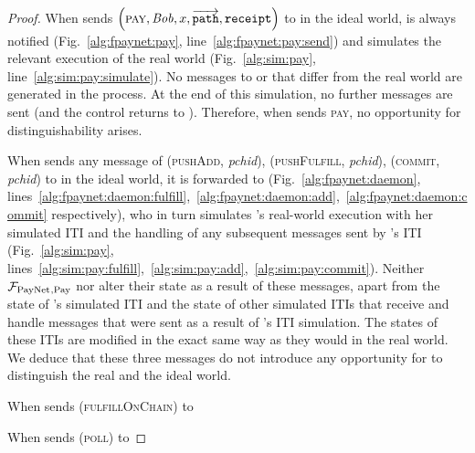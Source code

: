 \begin{proof}
  When \environment{} sends $\left(\textsc{pay}, \mathit{Bob}, x,
  \overrightarrow{\mathtt{path}}, \mathtt{receipt}\right)$ to \alice{} in the
  ideal world, \simulator{} is always notified (Fig.~\ref{alg:fpaynet:pay},
  line~\ref{alg:fpaynet:pay:send}) and simulates the relevant execution of the
  real world (Fig.~\ref{alg:sim:pay}, line~\ref{alg:sim:pay:simulate}). No
  messages to \ledger{} or \environment{} that differ from the real world are
  generated in the process. At the end of this simulation, no further messages
  are sent (and the control returns to \environment). Therefore, when
  \environment{} sends \textsc{pay}, no opportunity for distinguishability
  arises.

  When \environment{} sends any message of (\textsc{pushAdd}, \textit{pchid}),
  (\textsc{pushFulfill}, \textit{pchid}), (\textsc{commit}, \textit{pchid}) to
  \alice{} in the ideal world, it is forwarded to \simulator{}
  (Fig.~\ref{alg:fpaynet:daemon},
  lines~\ref{alg:fpaynet:daemon:fulfill},~\ref{alg:fpaynet:daemon:add},~\ref{alg:fpaynet:daemon:commit}
  respectively), who in turn simulates \alice's real-world execution with her
  simulated ITI and the handling of any subsequent messages sent by \alice's ITI
  (Fig.~\ref{alg:sim:pay},
  lines~\ref{alg:sim:pay:fulfill},~\ref{alg:sim:pay:add},~\ref{alg:sim:pay:commit}).
  Neither $\mathcal{F}_{\mathrm{PayNet}}{}_{\mathrm{, Pay}}$ nor \simulator{} alter their state as a
  result of these messages, apart from the state of \alice's simulated ITI and
  the state of other simulated ITIs that receive and handle messages that were
  sent as a result of \alice's ITI simulation. The states of these ITIs are
  modified in the exact same way as they would in the real world. We deduce that
  these three messages do not introduce any opportunity for \environment{} to
  distinguish the real and the ideal world.

  When \environment{} sends (\textsc{fulfillOnChain}) to \alice{}

  When \environment{} sends (\textsc{poll}) to \alice{}
\end{proof}
